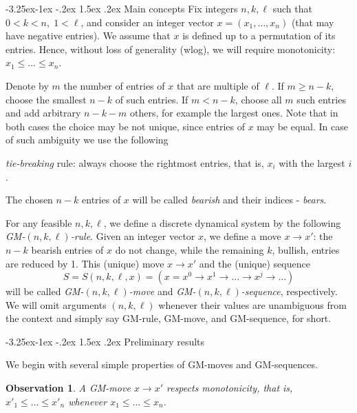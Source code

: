 \documentclass[10pt]{article}
\makeatletter
\renewcommand\subsection{\@startsection{subsection}{2}{\z@}
{-3.25ex\@plus -1ex \@minus -.2ex}
{1.5ex \@plus .2ex}
{\normalfont\normalsize\bfseries\boldmath}}
\newtheorem{observation}{Observation}
\theoremstyle{definition}
\makeatother
\begin{document}
\subsection{Main concepts}
\label{ss00}
Fix integers $n,k,\ell$ such that $0 < k < n, \; 1 < \ell$, 
and consider an integer vector $x = (x_1, \ldots, x_n)$  
(that may have negative entries).   
We assume that $x$ is defined up to a permutation of its entries. 
Hence, without loss of generality (wlog),  
we will require monotonicity: $x_1 \leq \ldots \leq x_n$. 

Denote by $m$ the number of entries of $x$  
that are multiple of  $\ell$. 
If  $m \geq n-k$, choose the smallest $n-k$ of such entries.
If  $m < n-k$, choose 
all  $m$  such entries %
and add arbitrary $n-k-m$  others, 
for example the largest ones. 
Note that in both cases the choice may be not unique, 
since entries of $x$  may be equal.
In case of such ambiguity we use the following 

\medskip 
\noindent 
{\em tie-breaking} rule: 
always choose the rightmost entries, 
that is, $x_i$  with the largest $i$. 

\medskip 

The chosen $n-k$ entries of  $x$  
will be called {\em bearish} and 
their indices - {\em bears}.  
 
For any feasible $n,k,\ell$, we define a discrete dynamical system 
by the following {\em GM-$(n,k,\ell)$-rule}. 
Given an integer vector $x$, 
we define a move $x \to x'$:   
the $n-k$ bearish entries of $x$ do not change, 
while the remaining $k$, bullish, entries are reduced by 1.
This (unique) move $x \to x'$  and 
the (unique) sequence 
$$S = S(n,k,\ell,x) = (x = x^0 \to x^1 \to \ldots \to x^j \to \ldots)$$   
will be called  {\em GM-$(n,k,\ell)$-move} and 
{\em GM-$(n,k,\ell)$-sequence}, respectively. 
We will omit arguments 
$(n,k,\ell)$ whenever their values are unambiguous from the context 
and simply say GM-rule, GM-move, and GM-sequence, for short. 

\subsection{Preliminary results}
\label{ss01}
 
We begin with several simple properties 
of GM-moves and GM-sequences. 

\begin{observation}
\label{o1}
A GM-move $x \to x'$ 
respects monotonicity, that is,   
$x'_1 \leq \ldots \leq x'_n$ whenever 
$x_1 \leq \ldots \leq x_n$.  
\end{observation}
\end{document}
